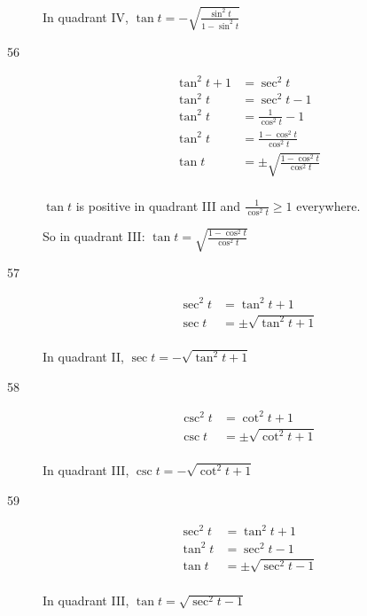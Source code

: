 \documentclass{exam}
\begin{document}
\begin{description}
        In quadrant IV, $\tan t = \boxed{ - \sqrt{ \frac{\sin^2 t}{1 - \sin^2 t} } }$

      \item[56] 
        \begin{align*}
          \tan^2 t + 1 & = \sec^2 t \\
          \tan^2 t     & = \sec^2 t - 1 \\
          \tan^2 t     & = \frac{1}{\cos^2 t} - 1 \\
          \tan^2 t     & = \frac{1 - \cos^2 t}{\cos^2 t} \\
          \tan t       & = \pm \sqrt{ \frac{1 - \cos^2 t}{\cos^2 t} } \\
        \end{align*}

        $\tan t$ is positive in quadrant III and $\frac{1}{\cos^2 t} \geq 1$ everywhere.  
        
        So in quadrant III: $\tan t = \boxed{ \sqrt{ \frac{1 - \cos^2 t}{\cos^2 t} } }$

      \item[57] 
        \begin{align*}
          \sec^2 t & = \tan^2 t + 1 \\
          \sec t   & = \pm \sqrt{\tan^2 t + 1} \\
        \end{align*}

        In quadrant II, $\sec t = \boxed{ - \sqrt{\tan^2 t + 1} }$ 

      \item[58] 
        \begin{align*}
          \csc^2 t & = \cot^2 t + 1 \\
          \csc t   & = \pm \sqrt{\cot^2 t + 1} \\
        \end{align*}

        In quadrant III, $\csc t = \boxed{ - \sqrt{\cot^2 t + 1} }$ 

      \item[59] 
        \begin{align*}
          \sec^2 t & = \tan^2 t + 1 \\
          \tan^2 t & = \sec^2 t - 1 \\
          \tan t   & = \pm \sqrt{ \sec^2 t - 1 } \\
        \end{align*}

        In quadrant III, $\tan t = \boxed{\sqrt{ \sec^2 t - 1 }}$ 


\end{description}
\end{document}
